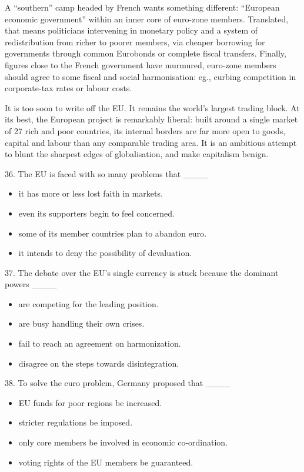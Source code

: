 \documentclass[UTF8,11pt]{ctexart}
\begin{document}
A “southern” camp headed by French wants something different: “European economic government” within an inner core of euro-zone members. Translated, that means politicians intervening in monetary policy and a system of redistribution from richer to poorer members, via cheaper borrowing for governments through common Eurobonds or complete fiscal transfers. Finally, figures close to the French government have murmured, euro-zone members should agree to some fiscal and social harmonisation: eg., curbing competition in corporate-tax rates or labour costs.


It is too soon to write off the EU. It remains the world’s largest trading block. At its best, the European project is remarkably liberal: built around a single market of 27 rich and poor countries, its internal borders are far more open to goods, capital and labour than any comparable trading area. It is an ambitious attempt to blunt the sharpest edges of globalisation, and make capitalism benign.


36. The EU is faced with so many problems that \_\_\_\_


\begin{itemize}[leftmargin=2em,itemsep=.2em,topsep=.4em]\item[A.] it has more or less lost faith in markets.
\item[B.] even its supporters begin to feel concerned.
\item[C.] some of its member countries plan to abandon euro.
\item[D.] it intends to deny the possibility of devaluation.
\end{itemize}

37. The debate over the EU’s single currency is stuck because the dominant powers \_\_\_\_


\begin{itemize}[leftmargin=2em,itemsep=.2em,topsep=.4em]\item[A.] are competing for the leading position.
\item[B.] are busy handling their own crises.
\item[C.] fail to reach an agreement on harmonization.
\item[D.] disagree on the steps towards disintegration.
\end{itemize}

38. To solve the euro problem, Germany proposed that \_\_\_\_


\begin{itemize}[leftmargin=2em,itemsep=.2em,topsep=.4em]\item[A.] EU funds for poor regions be increased.
\item[B.] stricter regulations be imposed.
\item[C.] only core members be involved in economic co-ordination.
\item[D.] voting rights of the EU members be guaranteed.
\end{itemize}
\end{document}
